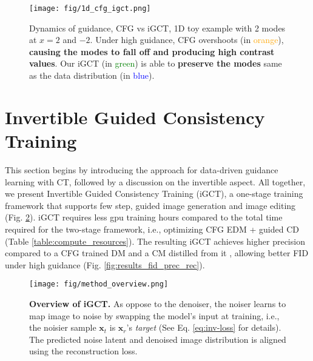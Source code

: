 \begin{figure}[t!]
    \centering
    \texttt{[image: fig/1d\_cfg\_igct.png]} 
    \vspace{-1em}
    \caption{Dynamics of guidance, CFG vs iGCT, 1D toy example with 2 modes at \(x=2\) and \(-2\). Under high guidance, CFG overshoots (in \textcolor{orange}{orange}), \textbf{causing the modes to fall off and producing high contrast values}. Our iGCT (in \textcolor{green}{green}) is able to \textbf{preserve the modes} same as the data distribution (in \textcolor{blue}{blue}). }
    \vspace{-1.5em}
    \label{fig:1d_cfg_igct}  %
\vspace{-0.5em}
\end{figure}

\vspace{-0.15cm}
\section{Invertible Guided Consistency Training}
\vspace{-0.15cm}

\label{sec:method}
This section begins by introducing the approach for data-driven guidance learning with CT, followed by a discussion on the invertible aspect. All together, we present Invertible Guided Consistency Training (iGCT), a one-stage training framework that supports few step, guided image generation and image editing (Fig. \ref{fig:method_overview}). iGCT requires less gpu training hours compared to the total time required for the two-stage framework, i.e., optimizing CFG EDM + guided CD (Table \ref{table:compute_resources}). The resulting iGCT achieves higher precision \cite{kynkäänniemi2019improvedprecisionrecallmetric} compared to a CFG trained DM and a CM distilled from it \cite{song2023consistency,luo2023latent}, allowing better FID under high guidance (Fig. \ref{fig:results_fid_prec_rec}).  


\begin{figure}[t!]  %
    \centering
    \texttt{[image: fig/method\_overview.png]} 
    \vspace{-1em}
    \caption{\textbf{Overview of iGCT.} As oppose to the denoiser, the noiser learns to map image to noise by swapping the model's input at training, i.e., the noisier sample \(\boldsymbol{x}_t\) is \(\boldsymbol{x}_r\)'s \textit{target} (See Eq. \ref{eq:inv-loss} for details). The predicted noise latent and denoised image distribution is aligned using the reconstruction loss. }
    \vspace{-1.0em}
    \label{fig:method_overview}  %
\end{figure}

